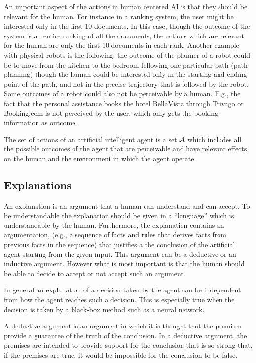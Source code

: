 An important aspect of the actions in human centered AI is that they
should be relevant for the human. For instance in a ranking system,
the user might be interested only in the first 10 documents. In this
case, though the outcome of the system is an entire ranking of all the
documents, the actions which are relevant for the human are only the
first 10 documents in each rank. Another example with physical robots
is the following: the outcome of the planner of a robot could be to
move from the kitchen to the bedroom following one particular path
(path planning) though the human could be interested only in the
starting and ending point of the path, and not in the precise
trajectory that is followed by the robot. Some outcomes of a robot
could also not be perceivable by a human. E.g., the fact that the
personal assistance books the hotel BellaVista through Trivago or
Booking.com is not perceived by the user, which only gets the booking
information as outcome.

\begin{definition}
  The set of actions of an artificial intelligent agent is a set
  $\mathcal{A}$ which includes all the possible outcomes of the 
  agent that are perceivable and have relevant effects on the human and the
  environment in which the agent operate.
\end{definition}

\subsection{Explanations} 
An explanation is an argument that a human can understand and can
accept. To be understandable the explanation should be given in a
``language'' which is understandable by the human. Furthermore, the
explanation contains an argumentation, (e.g., a sequence of facts and
rules that derives facts from previous facts in the sequence) that
justifies a the conclusion of the artificial agent starting from the
given input. This argument can be a deductive or an inductive
argument. However what is most important is that the human should be
able to decide to accept or not accept such an argument.

In general an explanation of a decision taken by the agent can be
independent from how the agent reaches such a decision. This is
especially true when the decision is taken by a black-box method such
as a neural network. 

A deductive argument is an argument in which it is thought that the
premises provide a guarantee of the truth of the conclusion. In a
deductive argument, the premises are intended to provide support for
the conclusion that is so strong that, if the premises are true, it
would be impossible for the conclusion to be false.

